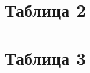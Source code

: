 \documentclass[a4paper,11pt]{article}
\begin{document}
\section{Таблица 2}

\section{Таблица 3}
\end{document}
